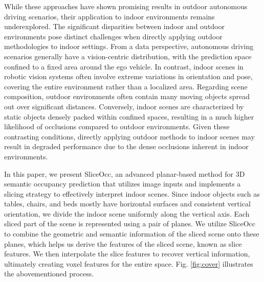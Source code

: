\documentclass[letterpaper, 10 pt, conference]{ieeeconf}  %
\begin{document}
While these approaches have shown promising results in outdoor autonomous driving scenarios, their application to indoor environments remains underexplored. The significant disparities between indoor and outdoor environments pose distinct challenges when directly applying outdoor methodologies to indoor settings. From a data perspective, autonomous driving scenarios generally have a vision-centric distribution, with the prediction space confined to a fixed area around the ego vehicle. In contrast, indoor scenes in robotic vision systems often involve extreme variations in orientation and pose, covering the entire environment rather than a localized area. Regarding scene composition, outdoor environments often contain many moving objects spread out over significant distances. Conversely, indoor scenes are characterized by static objects densely packed within confined spaces, resulting in a much higher likelihood of occlusions compared to outdoor environments. Given these contrasting conditions, directly applying outdoor methods to indoor scenes may result in degraded performance due to the dense occlusions inherent in indoor environments.







In this paper, we present SliceOcc, an advanced planar-based method for 3D semantic occupancy prediction that utilizes image inputs and implements a slicing strategy to effectively interpret indoor scenes. Since indoor objects such as tables, chairs, and beds mostly have horizontal surfaces and consistent vertical orientation, we divide the indoor scene uniformly along the vertical axis. Each sliced part of the scene is represented using a pair of planes. We utilize SliceOcc to combine the geometric and semantic information of the sliced scene onto these planes, which helps us derive the features of the sliced scene, known as slice features. We then interpolate the slice features to recover vertical information, ultimately creating voxel features for the entire space. Fig. \ref{fig:cover} illustrates the abovementioned process.
\end{document}
